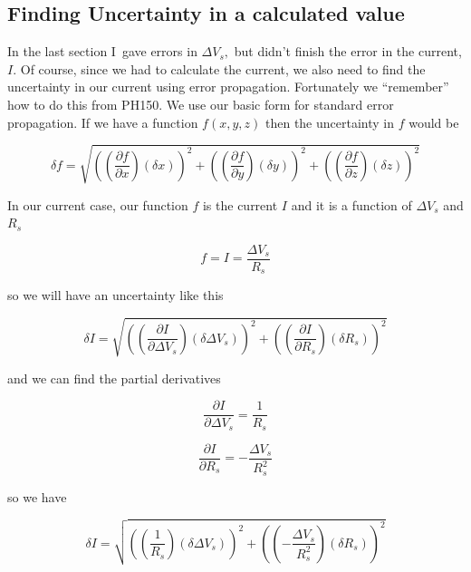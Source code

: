 \subsection{Finding Uncertainty in a calculated value}

In the last section I\ gave errors in $\Delta V_{s},$ but didn't finish the error in the current, $I.$ Of course, since we had to calculate the current, we also need to find the uncertainty in our current using error propagation. Fortunately we ``remember'' how to do this from PH150. We use our basic form for standard error propagation. If we have a function $f\left( x,y,z\right) $ then the uncertainty in $f$ would be 

\begin{equation*}
	\delta f=\sqrt{\left( \left( \frac{\partial f}{\partial x}\right)\left(\delta x\right) \right) ^{2}+\left( \left( \frac{\partial f}{\partial y}\right) \left( \delta y\right) \right) ^{2}+\left( \left( \frac{\partial f}{\partial z}\right) \left( \delta z\right) \right) ^{2}}
\end{equation*}

In our current case, our function $f$ is the current $I$ and it is a function of $\Delta V_{s}$ and $R_{s}$ 

\begin{equation*}
	f=I=\frac{\Delta V_{s}}{R_{s}}
\end{equation*}

\noindent so we will have an uncertainty like this

\begin{equation*}
	\delta I=\sqrt{\left( \left( \frac{\partial I}{\partial \Delta V_{s}}\right) \left( \delta \Delta V_{s}\right) \right) ^{2}+\left( \left( \frac{\partial I}{\partial R_{s}}\right) \left( \delta R_{s}\right) \right) ^{2}}
\end{equation*}

\noindent and we can find the partial derivatives

\begin{equation*}
	\frac{\partial I}{\partial \Delta V_{s}}=\frac{1}{R_{s}}
\end{equation*}

\begin{equation*}
	\frac{\partial I}{\partial R_{s}}=-\frac{\Delta V_{s}}{R_{s}^{2}}
\end{equation*}

\noindent so we have 

\begin{equation*}
	\delta I=\sqrt{\left( \left( \frac{1}{R_{s}}\right) \left( \delta \Delta V_{s}\right) \right) ^{2}+\left( \left( -\frac{\Delta V_{s}}{R_{s}^{2}}\right) \left( \delta R_{s}\right) \right) ^{2}}
\end{equation*}

